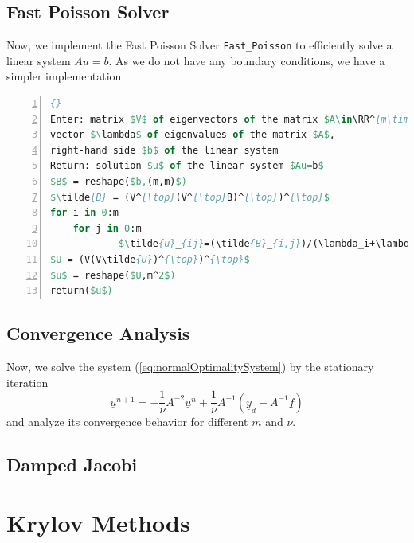 \documentclass{amsart}
\theoremstyle{definition}
\theoremstyle{remark}
\numberwithin{equation}{section}
\newcommand{\RR}{\mathbb{R}}
\begin{document}

\subsection{Fast Poisson Solver}
Now, we implement the Fast Poisson Solver \texttt{Fast\_Poisson} to efficiently solve a linear system $Au=b$. As we do not have any boundary conditions, we have a simpler implementation:

\begin{lstlisting}[mathescape, language=Pascal, title=Fast\_Poisson,
frame=single, numbers=left, numberstyle=\tiny, tabsize=2,
morekeywords={Enter, Return, elif}, deletekeywords={of}, keywordstyle=\bfseries]{}
Enter: matrix $V$ of eigenvectors of the matrix $A\in\RR^{m\times m}$, 
vector $\lambda$ of eigenvalues of the matrix $A$, 
right-hand side $b$ of the linear system
Return: solution $u$ of the linear system $Au=b$
$B$ = reshape($b,(m,m)$)
$\tilde{B} = (V^{\top}(V^{\top}B)^{\top})^{\top}$
for i in 0:m
	for j in 0:m
			$\tilde{u}_{ij}=(\tilde{B}_{i,j})/(\lambda_i+\lambda_j)$
$U = (V(V\tilde{U})^{\top})^{\top}$
$u$ = reshape($U,m^2$)
return($u$)
\end{lstlisting}


\subsection{Convergence Analysis}
Now, we solve the system (\ref{eq:normalOptimalitySystem}) by the stationary iteration
\begin{equation}
\underline{u}^{n+1} = -\frac{1}{\nu} A^{-2}\underline{u}^n + \frac{1}{\nu} A^{-1} (\underline{y}_d-A^{-1}\underline{f})
\end{equation}
and analyze its convergence behavior for different $m$ and $\nu$.

\subsection{Damped Jacobi}

\newpage
\section{Krylov Methods}
\end{document}
